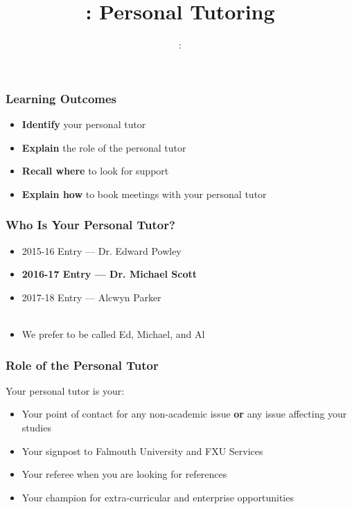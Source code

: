 \usepackage{../../beamerthemeFalmouthGamesAcademy}
\usepackage{multimedia}
\graphicspath{ {../../} }


\usepackage[normalem]{ulem}
\usepackage{wasysym}

\usepackage{pdfpages}

\usetikzlibrary{arrows,automata}




\title{\sessionnumber: Personal Tutoring}
\subtitle{\modulecode: \moduletitle}

\frame{\titlepage} 

\begin{frame}
	\frametitle{Learning Outcomes}
	\begin{itemize}
		\item \textbf{Identify} your personal tutor
		\item \textbf{Explain} the role of the personal tutor
		\item \textbf{Recall where} to look for support
		\item \textbf{Explain how} to book meetings with your personal tutor
	\end{itemize}
\end{frame}

\begin{frame}
	\frametitle{Who Is Your Personal Tutor?}	
	\begin{itemize}
		\item 2015-16 Entry --- Dr. Edward Powley \pause
		\item \textbf{2016-17 Entry --- Dr. Michael Scott} \pause
		\item 2017-18 Entry --- Alcwyn Parker \pause 
		\\~\\
		\item We prefer to be called Ed, Michael, and Al
	\end{itemize}
\end{frame}

\begin{frame}
	\frametitle{Role of the Personal Tutor}	
	
	Your personal tutor is your:
	
	\begin{itemize}
		\item Your point of contact for any non-academic issue \textbf{or} any issue affecting your studies
		\item Your signpost to Falmouth University and FXU Services
		\item Your referee when you are looking for references
		\item Your champion for extra-curricular and enterprise opportunities 
	\end{itemize}
\end{frame}

